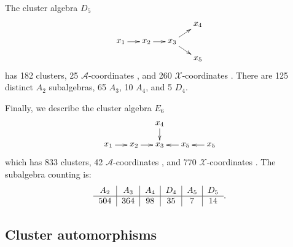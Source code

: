 \documentclass[11pt]{article}
\def\xcoords{$\mathcal{X}$-coordinates }
\def\acoords{$\mathcal{A}$-coordinates }
\begin{document}
The cluster algebra $D_5$
\begin{equation}\label{def:D5}
    \begin{gathered}
    \begin{xy} 0;<1pt,0pt>:<0pt,-1pt>::
      (0,20) *+{x_1} ="1",
      (30,20) *+{x_2} ="2",
      (60,20) *+{x_3} ="3",
      (90,0) *+{x_4} ="4",
      (90,40) *+{x_5} ="5",
      "1", {\ar"2"},
      "2", {\ar"3"},
      "3", {\ar"4"},
      "3", {\ar"5"},
    \end{xy}
    \end{gathered}
\end{equation}
has 182 clusters, 25 \acoords, and 260 \xcoords. There are 125 distinct $A_2$ subalgebras, 65 $A_3$, 10 $A_4$, and 5 $D_4$. 

Finally, we describe the cluster algebra $E_6$
\begin{equation}\label{def:E6}
    \begin{gathered}
    \begin{xy} 0;<1pt,0pt>:<0pt,-1pt>::
      (0,0) *+{x_1} ="1",
      (30,0) *+{x_2} ="2",
      (60,0) *+{x_3} ="3",
      (60,-25) *+{x_4} ="4",
      (90,0) *+{x_5} ="5",
      (120,0) *+{x_5} ="6",
      "1", {\ar"2"},
      "2", {\ar"3"},
      "4", {\ar"3"},
      "5", {\ar"3"},
      "6", {\ar"5"},
    \end{xy}
    \end{gathered}
\end{equation}
which has 833 clusters, 42 \acoords, and 770 \xcoords. The subalgebra counting is: 
\begin{equation}
\begin{tabular}{ c|c|c|c|c|c} 
 $A_2$ & $A_3$ & $A_4$ & $D_4$ & $A_5$ & $D_5$ \\ 
 \hline
504 & 364 & 98 & 35 & 7 & 14
\end{tabular}.
\end{equation}

\subsection{Cluster automorphisms}
\end{document}
